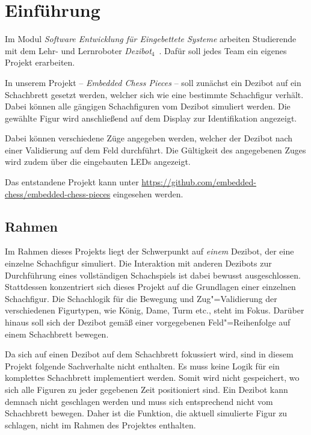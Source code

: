 
\section{Einführung}

Im Modul \emph{Software Entwicklung für Eingebettete Systeme} arbeiten Studierende mit dem Lehr- und Lernroboter \emph{Dezibot}$_\textit{4}$~\cite{dezibotteamDezibotDezibot2025}. Dafür soll jedes Team ein eigenes Projekt erarbeiten.

In unserem Projekt -- \emph{Embedded Chess Pieces} -- soll zunächst ein Dezibot auf ein Schachbrett gesetzt werden, welcher sich wie eine bestimmte Schachfigur verhält. Dabei können alle gängigen Schachfiguren vom Dezibot simuliert werden. Die gewählte Figur wird anschließend auf dem Display zur Identifikation angezeigt.

Dabei können verschiedene Züge angegeben werden, welcher der Dezibot nach einer Validierung auf dem Feld durchführt. Die Gültigkeit des angegebenen Zuges wird zudem über die eingebauten LEDs angezeigt.

Das entstandene Projekt kann unter \url{https://github.com/embedded-chess/embedded-chess-pieces} eingesehen werden.


\subsection{Rahmen}

Im Rahmen dieses Projekts liegt der Schwerpunkt auf \emph{einem} Dezibot, der eine einzelne Schachfigur simuliert. Die Interaktion mit anderen Dezibots zur Durchführung eines vollständigen Schachspiels ist dabei bewusst ausgeschlossen. Stattdessen konzentriert sich dieses Projekt auf die Grundlagen einer einzelnen Schachfigur. Die Schachlogik für die Bewegung und Zug"=Validierung der verschiedenen Figurtypen, wie König, Dame, Turm etc., steht im Fokus. Darüber hinaus soll sich der Dezibot gemäß einer vorgegebenen Feld"=Reihenfolge auf einem Schachbrett bewegen.


Da sich auf einen Dezibot auf dem Schachbrett fokussiert wird, sind in diesem Projekt folgende Sachverhalte nicht enthalten. Es muss keine Logik für ein komplettes Schachbrett implementiert werden. Somit wird nicht gespeichert, wo sich alle Figuren zu jeder gegebenen Zeit positioniert sind. Ein Dezibot kann demnach nicht geschlagen werden und muss sich entsprechend nicht vom Schachbrett bewegen. Daher ist die Funktion, die aktuell simulierte Figur zu schlagen, nicht im Rahmen des Projektes enthalten.

